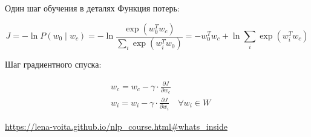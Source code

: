 \documentclass[notes,12pt, aspectratio=169]{beamer}
\begin{document}
\begin{frame}{Один шаг обучения в деталях}
Функция потерь:

 \[
J = - \ln P(w_0 \mid w_c)  = - \ln \frac{ \exp(w_0^T w_c)}{\sum_i \exp(w_i^T w_0) }   =   - w_0^T  w_c + \ln \sum_i \exp(w_i^T  w_c) 
\]

\vfill

Шаг градиентного спуска: 

\begin{equation*} 
\begin{aligned} 
	& w_c = w_c -  \gamma \cdot  \frac{\partial J}{\partial w_c} \\ 
	& w_i = w_i -  \gamma \cdot  \frac{\partial J}{\partial w_i} \quad \forall w_i \in W
\end{aligned}
\end{equation*}

\vfill
\footnotesize{\color{blue} \url{https://lena-voita.github.io/nlp_course.html\#whats\_inside}}
\end{frame}
\end{document}
